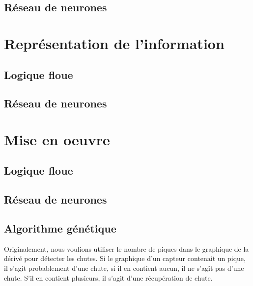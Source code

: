 \documentclass[12pt,letterpaper]{article}
\begin{document}
\subsection{Réseau de neurones} %

\section{Représentation de l'information}

\subsection{Logique floue}

\subsection{Réseau de neurones} %

\section{Mise en oeuvre}

\subsection{Logique floue}

\subsection{Réseau de neurones} %

\subsection{Algorithme génétique}

Originalement, nous voulions utiliser le nombre de piques dans le graphique de la dérivé pour détecter les chutes.
Si le graphique d'un capteur contenait un pique, il s'agit probablement d'une chute, si il en contient aucun, il 
ne s'agît pas d'une chute. S’il en contient plusieurs, il s'agit d'une récupération de chute. 
\end{document}
